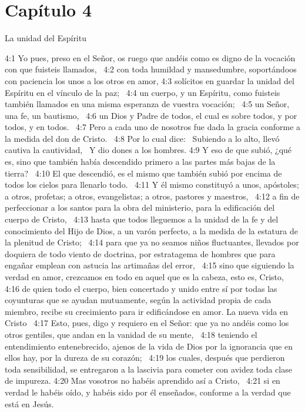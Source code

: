 \section*{Capítulo 4 }
La unidad del Espíritu  

4:1 Yo pues, preso en el Señor, os ruego que andéis como es digno de la vocación con que fuisteis llamados,  
4:2 con toda humildad y mansedumbre, soportándoos con paciencia los unos a los otros en amor, 
4:3 solícitos en guardar la unidad del Espíritu en el vínculo de la paz;  
4:4 un cuerpo, y un Espíritu, como fuisteis también llamados en una misma esperanza de vuestra vocación;  
4:5 un Señor, una fe, un bautismo,  
4:6 un Dios y Padre de todos, el cual es sobre todos, y por todos, y en todos.  
4:7 Pero a cada uno de nosotros fue dada la gracia conforme a la medida del don de Cristo.  
4:8 Por lo cual dice:  
Subiendo a lo alto, llevó cautiva la cautividad,  
Y dio dones a los hombres. 
4:9 Y eso de que subió, ¿qué es, sino que también había descendido primero a las partes más bajas de la tierra?  
4:10 El que descendió, es el mismo que también subió por encima de todos los cielos para llenarlo todo.  
4:11 Y él mismo constituyó a unos, apóstoles; a otros, profetas; a otros, evangelistas; a otros, pastores y maestros,  
4:12 a fin de perfeccionar a los santos para la obra del ministerio, para la edificación del cuerpo de Cristo,  
4:13 hasta que todos lleguemos a la unidad de la fe y del conocimiento del Hijo de Dios, a un varón perfecto, a la medida de la estatura de la plenitud de Cristo;  
4:14 para que ya no seamos niños fluctuantes, llevados por doquiera de todo viento de doctrina, por estratagema de hombres que para engañar emplean con astucia las artimañas del error,  
4:15 sino que siguiendo la verdad en amor, crezcamos en todo en aquel que es la cabeza, esto es, Cristo,  
4:16 de quien todo el cuerpo, bien concertado y unido entre sí por todas las coyunturas que se ayudan mutuamente, según la actividad propia de cada miembro, recibe su crecimiento para ir edificándose en amor. 
La nueva vida en Cristo  
4:17 Esto, pues, digo y requiero en el Señor: que ya no andéis como los otros gentiles, que andan en la vanidad de su mente,  
4:18 teniendo el entendimiento entenebrecido, ajenos de la vida de Dios por la ignorancia que en ellos hay, por la dureza de su corazón;  
4:19 los cuales, después que perdieron toda sensibilidad, se entregaron a la lascivia para cometer con avidez toda clase de impureza. 
4:20 Mas vosotros no habéis aprendido así a Cristo,  
4:21 si en verdad le habéis oído, y habéis sido por él enseñados, conforme a la verdad que está en Jesús. 
